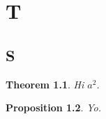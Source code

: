 \documentclass{book}
\theoremstyle{plain}
\newtheorem{theorem}{Theorem}
\numberwithin{theorem}{section}
\newtheorem{proposition}[theorem]{Proposition}
\begin{document}
\chapter{T}\section{S}
\begin{theorem}\label{t:x}Hi $a^2$.\end{theorem}
\begin{proposition}\label{p:y}Yo.\end{proposition}
\end{document}
